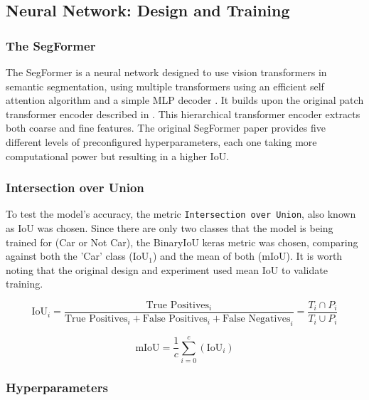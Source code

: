 \documentclass[12pt]{article}
\begin{document}
    \subsection*{Neural Network: Design and Training}

    \subsubsection*{The SegFormer}

    The SegFormer is a neural network designed to use vision transformers in semantic segmentation, using multiple transformers using an efficient self attention algorithm and a simple MLP decoder \cite{DBLP:journals/corr/abs-2105-15203}. It builds upon the original patch transformer encoder described in \cite{DBLP:journals/corr/abs-2010-11929}. This hierarchical transformer encoder extracts both coarse and fine features. The original SegFormer paper provides five different levels of preconfigured hyperparameters, each one taking more computational power but resulting in a higher IoU.

    \subsubsection*{Intersection over Union}

    To test the model's accuracy, the metric \texttt{Intersection over Union}, also known as IoU was chosen. Since there are only two classes that the model is being trained for (Car or Not Car), the BinaryIoU keras metric was chosen, comparing against both the 'Car' class ($\text{IoU}_1$) and the mean of both (mIoU). It is worth noting that the original design and experiment used mean IoU to validate training.

    \[
        \text{IoU}_i = \frac{\text{True Positives}_i}{\text{True Positives}_i + \text {False Positives}_i + \text{False Negatives}_i} = \frac{T_i \cap P_i}{T _i\cup P_i}
    \]


    \[
        \text{mIoU} = \frac{1}{c}\sum_{i=0}^{c}(\text{IoU}_i)
    \]

    \subsubsection*{Hyperparameters}
\end{document}
